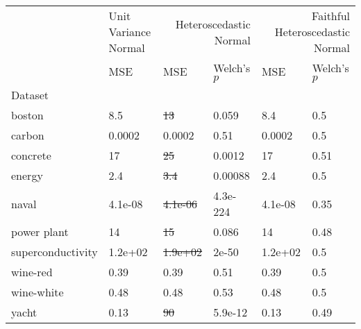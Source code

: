 \begin{tabular}{l|l|ll|ll}
\toprule
 & Unit Variance Normal & \multicolumn{2}{r}{Heteroscedastic Normal} & \multicolumn{2}{r}{Faithful Heteroscedastic Normal} \\
 & MSE & MSE & Welch's $p$ & MSE & Welch's $p$ \\
Dataset &  &  &  &  &  \\
\midrule
boston & 8.5 & \sout{13} & 0.059 & 8.4 & 0.5 \\
carbon & 0.0002 & 0.0002 & 0.51 & 0.0002 & 0.5 \\
concrete & 17 & \sout{25} & 0.0012 & 17 & 0.51 \\
energy & 2.4 & \sout{3.4} & 0.00088 & 2.4 & 0.5 \\
naval & 4.1e-08 & \sout{4.1e-06} & 4.3e-224 & 4.1e-08 & 0.35 \\
power plant & 14 & \sout{15} & 0.086 & 14 & 0.48 \\
superconductivity & 1.2e+02 & \sout{1.9e+02} & 2e-50 & 1.2e+02 & 0.5 \\
wine-red & 0.39 & 0.39 & 0.51 & 0.39 & 0.5 \\
wine-white & 0.48 & 0.48 & 0.53 & 0.48 & 0.5 \\
yacht & 0.13 & \sout{90} & 5.9e-12 & 0.13 & 0.49 \\
\bottomrule
\end{tabular}
